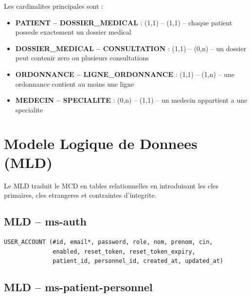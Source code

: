Les cardinalites principales sont :
\begin{itemize}
  \item \textbf{PATIENT -- DOSSIER\_MEDICAL} : (1,1) -- (1,1) -- chaque patient possede exactement un dossier medical
  \item \textbf{DOSSIER\_MEDICAL -- CONSULTATION} : (1,1) -- (0,n) -- un dossier peut contenir zero ou plusieurs consultations
  \item \textbf{ORDONNANCE -- LIGNE\_ORDONNANCE} : (1,1) -- (1,n) -- une ordonnance contient au moins une ligne
  \item \textbf{MEDECIN -- SPECIALITE} : (0,n) -- (1,1) -- un medecin appartient a une specialite
\end{itemize}

\section{Modele Logique de Donnees (MLD)}

Le MLD traduit le MCD en tables relationnelles en introduisant les cles primaires,
cles etrangeres et contraintes d'integrite.

\subsection{MLD -- ms-auth}

\begin{verbatim}
USER_ACCOUNT (#id, email*, password, role, nom, prenom, cin,
              enabled, reset_token, reset_token_expiry,
              patient_id, personnel_id, created_at, updated_at)
\end{verbatim}

\subsection{MLD -- ms-patient-personnel}

